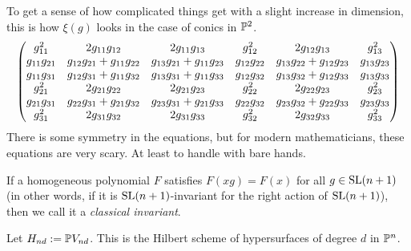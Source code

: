 \documentclass[11pt, english]{article}
\begin{document}
\begin{example}[Conics in the plane, $d=2$, $n=3$]
To get a sense of how complicated things get with a slight increase in dimension, this is how $\xi(g)$ looks in the case of conics in $\mathbb{P}^2$. 
\[
\bgroup\begin{pmatrix}{g}_{11}^{2}&
      2 {g}_{11} {g}_{12}&
      2 {g}_{11} {g}_{13}&
      {g}_{12}^{2}&
      2 {g}_{12} {g}_{13}&
      {g}_{13}^{2}\\
      {g}_{11} {g}_{21}&
      {g}_{12} {g}_{21}+{g}_{11} {g}_{22}&
      {g}_{13} {g}_{21}+{g}_{11} {g}_{23}&
      {g}_{12} {g}_{22}&
      {g}_{13} {g}_{22}+{g}_{12} {g}_{23}&
      {g}_{13} {g}_{23}\\
      {g}_{11} {g}_{31}&
      {g}_{12} {g}_{31}+{g}_{11} {g}_{32}&
      {g}_{13} {g}_{31}+{g}_{11} {g}_{33}&
      {g}_{12} {g}_{32}&
      {g}_{13} {g}_{32}+{g}_{12} {g}_{33}&
      {g}_{13} {g}_{33}\\
      {g}_{21}^{2}&
      2 {g}_{21} {g}_{22}&
      2 {g}_{21} {g}_{23}&
      {g}_{22}^{2}&
      2 {g}_{22} {g}_{23}&
      {g}_{23}^{2}\\
      {g}_{21} {g}_{31}&
      {g}_{22} {g}_{31}+{g}_{21} {g}_{32}&
      {g}_{23} {g}_{31}+{g}_{21} {g}_{33}&
      {g}_{22} {g}_{32}&
      {g}_{23} {g}_{32}+{g}_{22} {g}_{33}&
      {g}_{23} {g}_{33}\\
      {g}_{31}^{2}&
      2 {g}_{31} {g}_{32}&
      2 {g}_{31} {g}_{33}&
      {g}_{32}^{2}&
      2 {g}_{32} {g}_{33}&
      {g}_{33}^{2}\\
      \end{pmatrix}\egroup
\]
There is some symmetry in the equations, but for modern mathematicians, these equations are very scary. At least to handle with bare hands.  
\end{example}

\begin{defi}
 If a homogeneous polynomial $F$ satisfies $F(xg)=F(x)$ for all $g \in \operatorname{SL}(n+1)$ (in other words, if it is $\operatorname{SL}(n+1)$-invariant for the right action of $\operatorname{SL}(n+1)$), then we call it a \emph{classical invariant}.
\end{defi}

Let $H_{nd} := \mathbb{P} V_{nd}$. This is the Hilbert scheme of hypersurfaces of degree $d$ in $\mathbb{P}^n$. 
\end{document}
